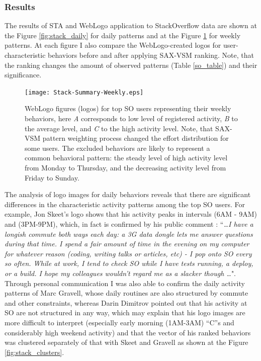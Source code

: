\subsubsection{Results}
The results of STA and WebLogo application to StackOverflow data are shown at the Figure \ref{fig:stack_daily} for daily patterns and at the Figure \ref{fig:stack_weekly} for weekly patterns. At each figure I also compare the WebLogo-created logos for user-characteristic behaviors before and after applying SAX-VSM ranking. Note, that the ranking changes the amount of observed patterns (Table \ref{so_table}) and their significance.

\begin{figure}[t]
   \centering
   \texttt{[image: Stack-Summary-Weekly.eps]}
   \caption{WebLogo figures (logos) for top SO users representing their weekly behaviors, here \textit{A} corresponds to low level of registered activity, \textit{B} to the average level, and \textit{C} to the high activity level. Note, that SAX-VSM pattern weighting process changed the effort distribution for some users. The excluded behaviors are likely to represent a common behavioral pattern: the steady level of high activity level from Monday to Thursday, and the decreasing activity level from Friday to Sunday.}
   \label{fig:stack_weekly}   
\end{figure}

The analysis of logo images for daily behaviors reveals that there are significant differences in the characteristic activity patterns among the top SO users. For example, Jon Skeet's logo shows that his activity peaks in intervals (6AM - 9AM) and (3PM-9PM), which, in fact is confirmed by his public comment \cite{skeet}: ``\textit{\dots I have a longish commute both ways each day: a 3G data dongle lets me answer questions during that time. I spend a fair amount of time in the evening on my computer for whatever reason (coding, writing talks or articles, etc) - I pop onto SO every so often. While at work, I tend to check SO while I have tests running, a deploy, or a build. I hope my colleagues wouldn't regard me as a slacker though \dots}". Through personal communication I was also able to confirm the daily activity patterns of Marc Gravell, whose daily routines are also structured by commute and other constraints, whereas Darin Dimitrov pointed out that his activity at SO are not structured in any way, which may explain that his logo images are more difficult to interpret (especially early morning (1AM-3AM) ``C''s and considerably high weekend activity) and that the vector of his ranked behaviors was clustered separately of that with Skeet and Gravell as shown at the Figure \ref{fig:stack_clusters}.

